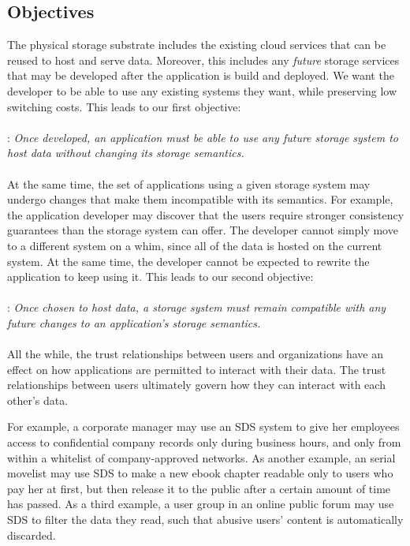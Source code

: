 \subsection{Objectives}

The physical storage substrate includes the existing cloud services that can be
reused to host and serve data.  Moreover, this includes any \emph{future}
storage services that may be developed after the application is build and
deployed.  We want the developer to be able to use any existing systems
they want, while preserving low switching costs.  This leads to our first
objective:
\\
\\
: \emph{Once developed, an application must be able to use any future storage
system to host data without changing its storage semantics.}
\\
\\
At the same time, the set of applications using a given storage system may
undergo changes that make them incompatible with its semantics.  For example,
the application developer may discover that the users require stronger
consistency guarantees than the storage system can offer.  The developer cannot
simply move to a different system on a whim, since all of the data is hosted 
on the current system.  At the same time, the developer cannot be expected
to rewrite the application to keep using it.  This leads to our second
objective:
\\
\\
: \emph{Once chosen to host data, a storage system must remain compatible with any
future changes to an application's storage semantics.}
\\
\\
All the while, the trust relationships between users and organizations have
an effect on how applications are permitted to interact with their data.
The trust relationships between users ultimately govern how they can interact
with each other's data.

For example, a corporate manager may use an SDS system to give her employees access
to confidential company records only during business hours, and only from 
within a whitelist of company-approved networks.
As another example, an serial movelist may use SDS to
make a new ebook chapter readable only to users who pay her at first, but then release it
to the public after a certain amount of time has passed.  As a third example,
a user group in an online public forum may use SDS to filter the data they read,
such that abusive users' content is automatically discarded.

